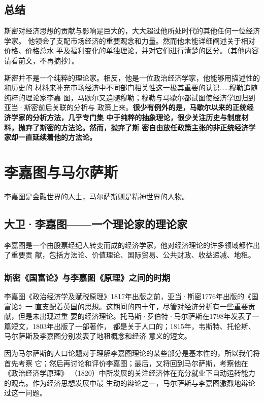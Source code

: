  \section{总结}

 斯密对经济思想的贡献与影响是巨大的，大大超过他所处时代的其他任何一位经济学家。
 他领会了支配市场经济的重要观念和力量。然而他未能详细阐述关于相对价格、价格总水
 平及福利变化的单独理论，并对它们进行清楚的区分。（其他内容请看前文，不再摘抄）。

 斯密并不是一个纯粹的理论家。相反，他是一位政治经济学家，他能够用描述性的和历史的
 材料来补充市场经济中不同部门相关性这一极其重要的认识……穆勒追随纯粹的理论家李嘉
 图，马歇尔又追随穆勒；穆勒与马歇尔都试图使经济学回归到亚当·斯密前后关联的分析与
 政策上来。\textbf{很少有例外的是，马歇尔以来的正统经济学家的分析方法，几乎专门集
   中于纯粹的抽象理论，很少关注历史与制度材料，抛弃了斯密的方法论。然而，抛弃了斯
   密自由放任政策主张的非正统经济学家却一直延续着他的方法论。}

 \chapter{李嘉图与马尔萨斯}

 李嘉图是金融世界的人士，马尔萨斯则是精神世界的人物。

 \section{大卫·李嘉图——一个理论家的理论家}

李嘉图是一个由股票经纪人转变而成的经济学家，他对经济理论的许多领域都作出了重要贡
献，包括方法论、价值理论、国际贸易、公共财政、收益递减、地租。

\subsection{斯密《国富论》与李嘉图《原理》之间的时期}

李嘉图《政治经济学及赋税原理》1817年出版之前，亚当·斯密1776年出版的《国富论》一
直支配着英国的思想。这期间的四十年，尽管对经济分析有一些重要贡献，但是未出现过重
要的经济理论。托马斯·罗伯特·马尔萨斯在1798年发表了一篇短文，1803年出版了一部著作，
都是关于人口的；1815年，韦斯特、托伦斯、马尔萨斯及李嘉图分别发表了地租概念和经济
意义的短文。

因为马尔萨斯的人口论题对于理解李嘉图理论的某些部分是基本性的，所以我们将首先考察
它；然后再讨论和评价李嘉图；最后，又将回到马尔萨斯，考察他在《政治经济学原理》
（1820）中所发展的关注经济体在充分就业下自动运转能力的观点。作为经济思想发展中最
生动的辩论之一，马尔萨斯与李嘉图激烈地辩论过这一问题。


